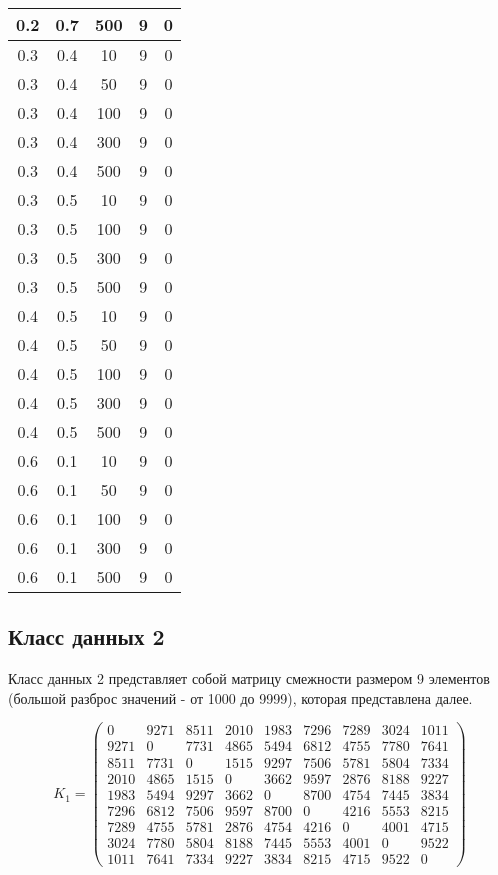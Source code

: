 \begin{center}
\begin{longtable}[c]{|c|c|c|c|c|}
		0.2 & 0.7 & 500 &    9 &    0 \\ \hline
		0.3 & 0.4 &  10 &    9 &    0 \\
		0.3 & 0.4 &  50 &    9 &    0 \\
		0.3 & 0.4 & 100 &    9 &    0 \\
		0.3 & 0.4 & 300 &    9 &    0 \\
		0.3 & 0.4 & 500 &    9 &    0 \\ \hline
		0.3 & 0.5 &  10 &    9 &    0 \\
		0.3 & 0.5 & 100 &    9 &    0 \\
		0.3 & 0.5 & 300 &    9 &    0 \\
		0.3 & 0.5 & 500 &    9 &    0 \\ \hline
		0.4 & 0.5 &  10 &    9 &    0 \\
		0.4 & 0.5 &  50 &    9 &    0 \\
		0.4 & 0.5 & 100 &    9 &    0 \\
		0.4 & 0.5 & 300 &    9 &    0 \\
		0.4 & 0.5 & 500 &    9 &    0 \\ \hline
		0.6 & 0.1 &  10 &    9 &    0 \\
		0.6 & 0.1 &  50 &    9 &    0 \\
		0.6 & 0.1 & 100 &    9 &    0 \\
		0.6 & 0.1 & 300 &    9 &    0 \\
		0.6 & 0.1 & 500 &    9 &    0 \\ \hline
	\end{longtable}
\end{center}


\subsection{Класс данных 2}\label{par:class2}


Класс данных 2 представляет собой матрицу смежности размером 9 элементов (большой разброс значений - от 1000 до 9999), которая представлена далее.

\begin{equation}
	\label{eq:kd2}
	K_{1} = \begin{pmatrix}
		0 & 9271 & 8511 & 2010 & 1983 & 7296 & 7289 & 3024 & 1011 \\
		9271 & 0 & 7731 & 4865 & 5494 & 6812 & 4755 & 7780 & 7641 \\
		8511 & 7731 & 0 & 1515 & 9297 & 7506 & 5781 & 5804 & 7334 \\
		2010 & 4865 & 1515 & 0 & 3662 & 9597 & 2876 & 8188 & 9227 \\
		1983 & 5494 & 9297 & 3662 & 0 & 8700 & 4754 & 7445 & 3834 \\
		7296 & 6812 & 7506 & 9597 & 8700 & 0 & 4216 & 5553 & 8215 \\
		7289 & 4755 & 5781 & 2876 & 4754 & 4216 & 0 & 4001 & 4715 \\
		3024 & 7780 & 5804 & 8188 & 7445 & 5553 & 4001 & 0 & 9522 \\
		1011 & 7641 & 7334 & 9227 & 3834 & 8215 & 4715 & 9522 & 0 
	\end{pmatrix}
\end{equation}


